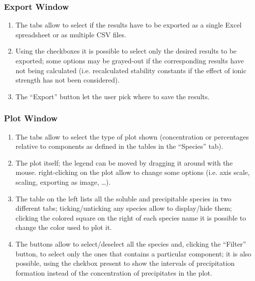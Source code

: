 \documentclass[a4paper, 12pt]{article}
\newcommand*\circled[1]{\kern-2.5em%
  \put(0,4){\color{red}\circle*{18}}\put(0,4){\circle{16}}%
  \put(-4,0){\color{white}\bfseries\large#1}~~}
\begin{document}
\subsubsection{Export Window}
\begin{enumerate}[label=\protect\circled{\arabic*}]
    \item The tabs allow to select if the results have to be exported as a single Excel spreadsheet or as multiple CSV files.
    \item Using the checkboxes it is possible to select only the desired results to be exported; some options may be grayed-out if the corresponding results have not being calculated (i.e. recalculated stability constants if the effect of ionic strength has not been considered).
    \item The ``Export'' button let the user pick where to save the results.
\end{enumerate}

\subsubsection{Plot Window}
\begin{enumerate}[label=\protect\circled{\arabic*}]
    \item The tabs allow to select the type of plot shown (concentration or percentages relative to components as defined in the tables in the ``Species'' tab).
    \item The plot itself; the legend can be moved by dragging it around with the mouse. right-clicking on the plot allow to change some options (i.e. axis scale, scaling, exporting as image, \ldots).
    \item The table on the left lists all the soluble and precipitable species in two different tabs; ticking/unticking any species allow to display/hide them; clicking the colored square on the right of each species name it is possible to change the color used to plot it.
    \item The buttons allow to select/deselect all the species and, clicking the ``Filter'' button, to select only the ones that contains a particular component; it is also possible, using the chekbox present to show the intervals of precipitation formation instead of the concentration of precipitates in the plot.
\end{enumerate}
\end{document}
